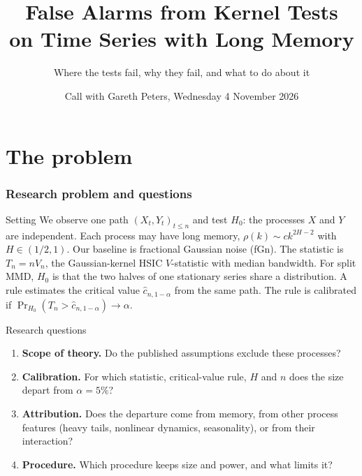 \documentclass[11pt, aspectratio=169, xcolor={dvipsnames}]{beamer}
\title[False alarms on long-memory data]{False Alarms from Kernel Tests\\on Time Series with Long Memory}
\subtitle{Where the tests fail, why they fail, and what to do about it}
\author{}
\date{Call with Gareth Peters, Wednesday 4 November 2026}
\begin{document}
\section{The problem}
\begin{frame}[plain]\titlepage\end{frame}

\begin{frame}
\frametitle{Research problem and questions}
\begin{block}{Setting}\small
We observe one path $(X_t,Y_t)_{t\le n}$ and test $H_0$: the processes $X$ and $Y$ are independent. Each process may have long memory, $\rho(k)\sim ck^{2H-2}$ with $H\in(1/2,1)$. Our baseline is fractional Gaussian noise (fGn). The statistic is $T_n=nV_n$, the Gaussian-kernel HSIC $V$-statistic with median bandwidth. For split MMD, $H_0$ is that the two halves of one stationary series share a distribution. A rule estimates the critical value $\hat c_{n,1-\alpha}$ from the same path. The rule is calibrated if $\Pr_{H_0}(T_n>\hat c_{n,1-\alpha})\to\alpha$.
\end{block}
\begin{block}{Research questions}\small
\begin{enumerate}
\item \textbf{Scope of theory.} Do the published assumptions exclude these processes?
\item \textbf{Calibration.} For which statistic, critical-value rule, $H$ and $n$ does the size depart from $\alpha=5\%$?
\item \textbf{Attribution.} Does the departure come from memory, from other process features (heavy tails, nonlinear dynamics, seasonality), or from their interaction?
\item \textbf{Procedure.} Which procedure keeps size and power, and what limits it?
\end{enumerate}
\end{block}
\end{frame}
\end{document}

